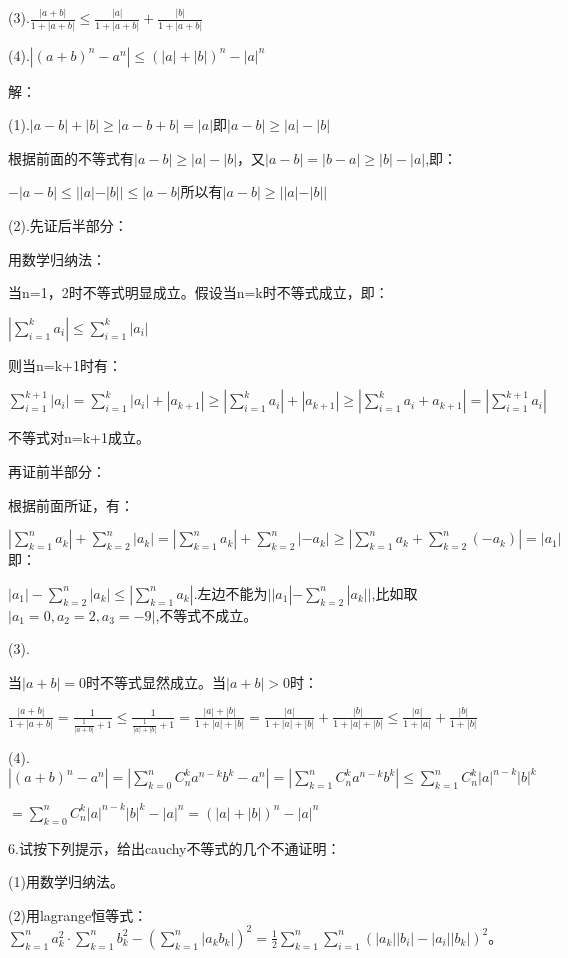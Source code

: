 \documentclass[12pt]{ctexart}
\begin{document}
(3).$\frac{|a+b|}{1+|a+b|}\le{\frac{|a|}{1+|a+b|}+\frac{|b|}{1+|a+b|}}$

(4).$|(a+b)^n-a^n|\le{(|a|+|b|)^n-|a|^n}$

解：

(1).$|a-b|+|b|\ge|a-b+b|=|a|$即$|a-b|\ge|a|-|b|$

根据前面的不等式有$|a-b|\ge|a|-|b|$，又$|a-b|=|b-a|\ge{|b|-|a|}$,即：


$-|a-b|\le||a|-|b||\le{|a-b|}$所以有$|a-b|\ge||a|-|b||$

(2).先证后半部分：

用数学归纳法：

当n=1，2时不等式明显成立。假设当n=k时不等式成立，即：

$|\sum\limits_{i=1}^{k}a_i|\le\sum\limits_{i=1}^{k}|a_i|$

则当n=k+1时有：

$\sum\limits_{i=1}^{k+1}|a_i|=\sum\limits_{i=1}^{k}|a_i|+|a_{k+1}|\ge{|\sum\limits_{i=1}^{k}a_i|+|a_{k+1}|}\ge{|\sum\limits_{i=1}^{k}a_i+a_{k+1}|}=|\sum\limits_{i=1}^{k+1}a_i|$

不等式对n=k+1成立。

再证前半部分：

根据前面所证，有：

$|\sum\limits_{k=1}^{n}a_k|+\sum\limits_{k=2}^{n}|a_k|=|\sum\limits_{k=1}^{n}a_k|+\sum\limits_{k=2}^{n}|-a_k|\ge{|\sum\limits_{k=1}^{n}a_k+\sum\limits_{k=2}^{n}(-a_k)|}=|a_1|$即：

$|a_1|-\sum\limits_{k=2}^{n}|a_k|\le{|\sum\limits_{k=1}^{n}a_k|}$.左边不能为$||a_1|-\sum\limits_{k=2}^n|a_k||$,比如取$|a_1=0,a_2=2,a_3=-9|$,不等式不成立。

(3).

当$|a+b|=0$时不等式显然成立。当$|a+b|>0$时：

$\frac{|a+b|}{1+|a+b|}=\frac{1}{\frac{1}{|a+b|}+1}\le\frac{1}{\frac{1}{|a|+|b|}+1}=\frac{|a|+|b|}{1+|a|+|b|}=\frac{|a|}{1+|a|+|b|}+\frac{|b|}{1+|a|+|b|}\le\frac{|a|}{1+|a|}+\frac{|b|}{1+|b|}$

(4).$|(a+b)^n-a^n|=|\sum\limits_{k=0}^nC_n^ka^{n-k}b^k-a^n|=|\sum\limits_{k=1}^nC_n^ka^{n-k}b^k|\le\sum\limits_{k=1}^nC_n^k|a|^{n-k}|b|^k$

$=\sum\limits_{k=0}^nC_n^k|a|^{n-k}|b|^k-|a|^n=(|a|+|b|)^n-|a|^n$

6.试按下列提示，给出cauchy不等式的几个不通证明：

(1)用数学归纳法。

(2)用lagrange恒等式：$\sum\limits_{k=1}^{n}a_k^2\cdot\sum\limits_{k=1}^{n}b_k^2-(\sum\limits_{k=1}^{n}|a_kb_k|)^2=\frac{1}{2}\sum\limits_{k=1}^n\sum\limits_{i=1}^n(|a_k||b_i|-|a_i||b_k|)^2$。
\end{document}
